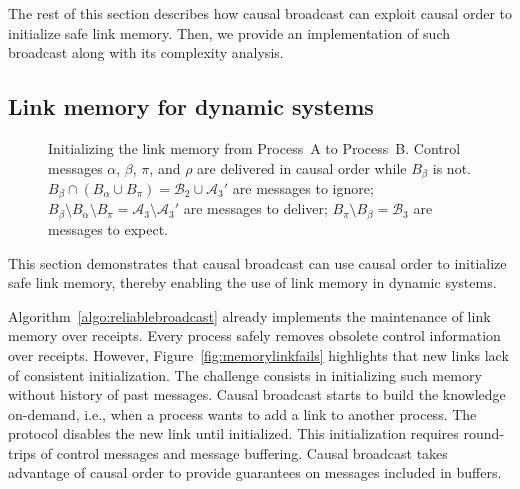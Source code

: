 The rest of this section describes how causal broadcast can exploit causal order
to initialize safe link memory. Then, we provide an implementation of such
broadcast along with its complexity analysis.

\subsection{Link memory for dynamic systems}


\begin{figure*}
  \begin{center}
    
    \caption{\label{fig:timelineproof}\label{fig:timeline}Initializing the link
      memory from Process~A to Process~B. Control messages $\alpha$, $\beta$,
      $\pi$, and $\rho$ are delivered in causal order while $B_\beta$ is not.
      $B_\beta \cap (B_\alpha \cup B_\pi) = \mathcal{B}_2 \cup \mathcal{A}_3'$
      are messages to ignore;
      $B_\beta \setminus B_\alpha \setminus B_\pi = \mathcal{A}_3\setminus
      \mathcal{A}_3'$
      are messages to deliver; $B_\pi \setminus B_\beta = \mathcal{B}_3$ are
      messages to expect.}
  \end{center}
\end{figure*}

This section demonstrates that causal broadcast can use causal order to
initialize safe link memory, thereby enabling the use of link memory in dynamic
systems.

Algorithm~\ref{algo:reliablebroadcast} already implements the maintenance of
link memory over receipts. Every process safely removes obsolete control
information over receipts.  However, Figure~\ref{fig:memorylinkfails} highlights
that new links lack of consistent initialization. The challenge consists in
initializing such memory without history of past messages. Causal broadcast
starts to build the knowledge on-demand, i.e., when a process wants to add a
link to another process.  The protocol disables the new link until
initialized. This initialization requires round-trips of control messages and
message buffering.  Causal broadcast takes advantage of causal order to provide
guarantees on messages included in buffers.


